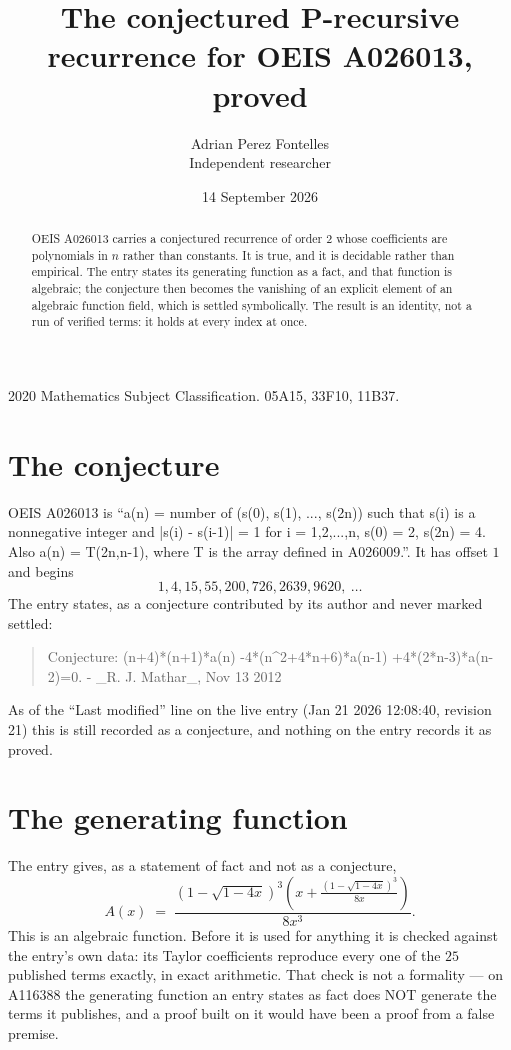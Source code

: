 \documentclass[11pt,a4paper]{article}
\title{The conjectured P-recursive recurrence for OEIS A026013, proved}
\author{Adrian Perez Fontelles\\ \small Independent researcher}
\date{14 September 2026}
\theoremstyle{plain}
\theoremstyle{definition}
\begin{document}
\maketitle

\begin{abstract}
OEIS A026013 carries a conjectured recurrence of order $2$ whose coefficients are polynomials in
$n$ rather than constants. It is true, and it is decidable rather than empirical. The entry
states its generating function as a fact, and that function is algebraic; the conjecture then
becomes the vanishing of an explicit element of an algebraic function field, which is settled
symbolically. The result is an identity, not a run of verified terms: it holds at every index
at once.
\end{abstract}

\noindent\small 2020 Mathematics Subject Classification. 05A15, 33F10, 11B37.\normalsize

\section{The conjecture}

OEIS A026013 is ``a(n) = number of (s(0), s(1), ..., s(2n)) such that s(i) is a nonnegative integer and |s(i) - s(i-1)| = 1 for i = 1,2,...,n, s(0) = 2, s(2n) = 4. Also a(n) = T(2n,n-1), where T is the array defined in A026009.''. It has offset $1$ and begins
\[
1, 4, 15, 55, 200, 726, 2639, 9620,\ \dots
\]
The entry states, as a conjecture contributed by its author and never marked settled:
\begin{quote}\raggedright\small
Conjecture: (n+4)*(n+1)*a(n) -4*(n\^{}2+4*n+6)*a(n-1) +4*(2*n-3)*a(n-2)=0. - \_R. J. Mathar\_, Nov 13 2012
\end{quote}
As of the ``Last modified'' line on the live entry (Jan 21 2026 12:08:40, revision 21)
this is still recorded as a conjecture, and nothing on the entry records it as proved.

\section{The generating function}

The entry gives, as a statement of fact and not as a conjecture,
\[
A(x)\;=\;\frac{\left(1 - \sqrt{1 - 4 x}\right)^{3} \left(x + \frac{\left(1 - \sqrt{1 - 4 x}\right)^{3}}{8 x}\right)}{8 x^{3}} .
\]
This is an algebraic function. Before it is used for anything it is checked against the entry's
own data: its Taylor coefficients reproduce every one of the $25$ published terms
exactly, in exact arithmetic. That check is not a formality --- on A116388 the generating
function an entry states as fact does NOT generate the terms it publishes, and a proof built on
it would have been a proof from a false premise.
\end{document}

